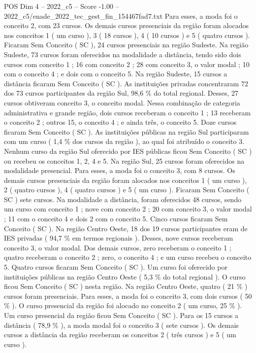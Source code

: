 \begin{textsample}{POS Dim 4 – 2022\_c5 – Score -1.00 – 2022\_c5/enade\_2022\_tec\_gest\_fin\_154467fad7.txt}
Para esses, a moda foi o conceito 2, com 23 cursos.
Os demais cursos presenciais da região foram alocados nos conceitos 1 ( um curso ), 3 ( 18 cursos ), 4 ( 10 cursos ) e 5 ( quatro cursos ).
Ficaram Sem Conceito ( SC ), 24 cursos presenciais na região Sudeste.
Na região Sudeste, 73 cursos foram oferecidos na modalidade a distância, tendo sido dois cursos com conceito 1 ; 16 com conceito 2 ; 28 com conceito 3, o valor modal ; 10 com o conceito 4 ; e dois com o conceito 5.
Na região Sudeste, 15 cursos a distância ficaram Sem Conceito ( SC ).
As instituições privadas concentraram 72 dos 73 cursos participantes da região Sul, 98,6 \% do total regional.
Desses, 27 cursos obtiveram conceito 3, o conceito modal.
Nessa combinação de categoria administrativa e grande região, dois cursos receberam o conceito 1 ; 13 receberam o conceito 2 ; outros 15, o conceito 4 ; e ainda três, o conceito 5.
Doze cursos ficaram Sem Conceito ( SC ).
As instituições públicas na região Sul participaram com um curso ( 1,4 \% dos cursos da região ), ao qual foi atribuído o conceito 3.
Nenhum curso da região Sul oferecido por IES públicas ficou Sem Conceito ( SC ) ou recebeu os conceitos 1, 2, 4 e 5.
Na região Sul, 25 cursos foram oferecidos na modalidade presencial.
Para esses, a moda foi o conceito 3, com 8 cursos.
Os demais cursos presenciais da região foram alocados nos conceitos 1 ( um curso ), 2 ( quatro cursos ), 4 ( quatro cursos ) e 5 ( um curso ).
Ficaram Sem Conceito ( SC ) sete cursos.
Na modalidade a distância, foram oferecidos 48 cursos, sendo um curso com conceito 1 ; nove com conceito 2 ; 20 com conceito 3, o valor modal ; 11 com o conceito 4 e dois 2 com o conceito 5.
Cinco cursos ficaram Sem Conceito ( SC ).
Na região Centro Oeste, 18 dos 19 cursos participantes eram de IES privadas ( 94,7 \% em termos regionais ).
Desses, nove cursos receberam conceito 3, o valor modal.
Dos demais cursos, zero receberam o conceito 1 ; quatro receberam o conceito 2 ; zero, o conceito 4 ; e um curso recebeu o conceito 5.
Quatro cursos ficaram Sem Conceito ( SC ).
Um curso foi oferecido por instituições públicas na região Centro Oeste ( 5,3 \% do total regional ).
O curso ficou Sem Conceito ( SC ) nesta região.
Na região Centro Oeste, quatro ( 21 \% ) cursos foram presenciais.
Para esses, a moda foi o conceito 3, com dois cursos ( 50 \% ).
O curso presencial da região foi alocado no conceito 2 ( um curso, 25 \% ).
Um curso presencial da região ficou Sem Conceito ( SC ).
Para os 15 cursos a distância ( 78,9 \% ), a moda modal foi o conceito 3 ( sete cursos ).
Os demais cursos a distância da região receberam os conceitos 2 ( três cursos ) e 5 ( um curso ).

\end{textsample}
